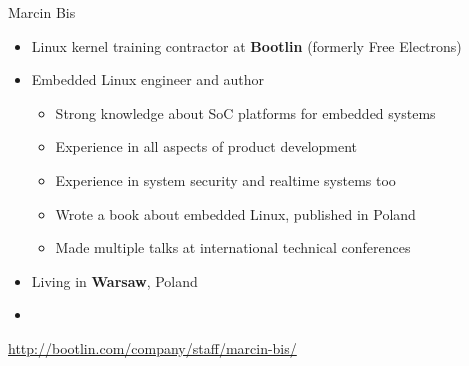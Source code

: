 \begin{frame}{Marcin Bis}
    \begin{itemize}
      \item Linux kernel training contractor at {\bf Bootlin}
	    (formerly Free Electrons)
      \item Embedded Linux engineer and author
        \begin{itemize}
	  \item Strong knowledge about SoC platforms for embedded systems
	  \item Experience in all aspects of product development
	  \item Experience in system security and realtime systems too
	  \item Wrote a book about embedded Linux, published in Poland
	  \item Made multiple talks at international technical conferences
        \end{itemize}
      \item Living in {\bf Warsaw}, Poland
      \item {}
    \end{itemize}
    {\small \url{http://bootlin.com/company/staff/marcin-bis/}}
\end{frame}

